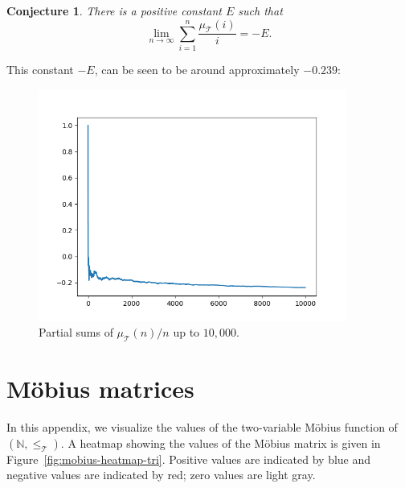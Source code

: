 \documentclass{amsart}
\newtheorem{conj}[thm]{Conjecture}
\theoremstyle{definition}
\newcommand{\NN}{\mathbb{N}}
\newcommand{\Mobius}{M\"obius}
\newcommand{\leqtri}{\leq_{\tri}}
\newcommand{\mutri}{\mu_{\tri}}
\newcommand{\tri}{\mathcal T}
\begin{document}
\begin{conj}
\label{conj:asymptote}
There is a positive constant $E$ such that
\begin{equation}
    \lim_{n\to\infty} \sum_{i=1}^n \frac{\mutri(i)}{i} = - E .
\end{equation}
\end{conj}

This constant $-E$, can be seen to be around approximately $-0.239$:

\begin{figure}[h!]
    \centering
    \includegraphics[width=4in]{Partial_Sums.png}
    \vspace{-0.5cm}
    \caption{Partial sums of $\mutri(n)/n$ up to $10,000$.}
    \label{fig:enter-label}
\end{figure}

\newpage


%
%



\newpage
%
%
\appendix
\section{\Mobius{} matrices}\label{sec:mobius-data}

In this appendix, we visualize the values of the two-variable \Mobius{} function of $(\NN, \leqtri)$.
A heatmap showing the values of the \Mobius{} matrix is given in Figure~\ref{fig:mobius-heatmap-tri}.
Positive values are indicated by blue and negative values are indicated by red; zero values are light gray.
\end{document}
